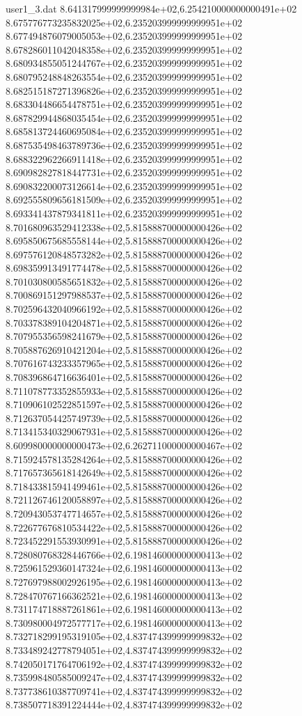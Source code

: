 \begin{filecontents}{user1_3.dat}
8.641317999999999984e+02,6.254210000000000491e+02
8.675776773235832025e+02,6.235203999999999951e+02
8.677494876079005053e+02,6.235203999999999951e+02
8.678286011042048358e+02,6.235203999999999951e+02
8.680934855051244767e+02,6.235203999999999951e+02
8.680795248848263554e+02,6.235203999999999951e+02
8.682515187271396826e+02,6.235203999999999951e+02
8.683304486654478751e+02,6.235203999999999951e+02
8.687829944868035454e+02,6.235203999999999951e+02
8.685813724460695084e+02,6.235203999999999951e+02
8.687535498463789736e+02,6.235203999999999951e+02
8.688322962266911418e+02,6.235203999999999951e+02
8.690982827818447731e+02,6.235203999999999951e+02
8.690832200073126614e+02,6.235203999999999951e+02
8.692555809656181509e+02,6.235203999999999951e+02
8.693341437879341811e+02,6.235203999999999951e+02
8.701680963529412338e+02,5.815888700000000426e+02
8.695850675685558144e+02,5.815888700000000426e+02
8.697576120848573282e+02,5.815888700000000426e+02
8.698359913491774478e+02,5.815888700000000426e+02
8.701030800585651832e+02,5.815888700000000426e+02
8.700869151297988537e+02,5.815888700000000426e+02
8.702596432040966192e+02,5.815888700000000426e+02
8.703378389104204871e+02,5.815888700000000426e+02
8.707955356598241679e+02,5.815888700000000426e+02
8.705887626910421204e+02,5.815888700000000426e+02
8.707616743233357965e+02,5.815888700000000426e+02
8.708396864716636401e+02,5.815888700000000426e+02
8.711078773352855933e+02,5.815888700000000426e+02
8.710906102522851597e+02,5.815888700000000426e+02
8.712637054425749739e+02,5.815888700000000426e+02
8.713415340329067931e+02,5.815888700000000426e+02
8.609980000000000473e+02,6.262711000000000467e+02
8.715924578135284264e+02,5.815888700000000426e+02
8.717657365618142649e+02,5.815888700000000426e+02
8.718433815941499461e+02,5.815888700000000426e+02
8.721126746120058897e+02,5.815888700000000426e+02
8.720943053747714657e+02,5.815888700000000426e+02
8.722677676810534422e+02,5.815888700000000426e+02
8.723452291553930991e+02,5.815888700000000426e+02
8.728080768328446766e+02,6.198146000000000413e+02
8.725961529360147324e+02,6.198146000000000413e+02
8.727697988002926195e+02,6.198146000000000413e+02
8.728470767166362521e+02,6.198146000000000413e+02
8.731174718887261861e+02,6.198146000000000413e+02
8.730980004972577717e+02,6.198146000000000413e+02
8.732718299195319105e+02,4.837474399999999832e+02
8.733489242778794051e+02,4.837474399999999832e+02
8.742050171764706192e+02,4.837474399999999832e+02
8.735998480585009247e+02,4.837474399999999832e+02
8.737738610387709741e+02,4.837474399999999832e+02
8.738507718391224444e+02,4.837474399999999832e+02

\end{filecontents}
